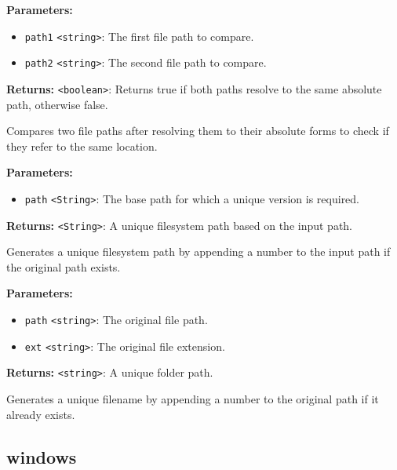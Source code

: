 \documentclass[12pt,a4paper]{article}
\begin{document}
\noindent \textbf{Parameters:}
\begin{itemize}
  \item \texttt{path1} \texttt{<string>}: The first file path to compare.
  \item \texttt{path2} \texttt{<string>}: The second file path to compare.
\end{itemize}

\noindent \textbf{Returns:} \texttt{<boolean>}: Returns true if both paths resolve to the same absolute path, otherwise false.

\noindent Compares two file paths after resolving them to their absolute forms to check if they refer to the same location.

\vspace{5mm}
\noindent {}


\noindent \textbf{Parameters:}
\begin{itemize}
  \item \texttt{path} \texttt{<String>}: The base path for which a unique version is required.
\end{itemize}

\noindent \textbf{Returns:} \texttt{<String>}: A unique filesystem path based on the input path.

\noindent Generates a unique filesystem path by appending a number to the input path if the original path exists.

\vspace{5mm}
\noindent {}


\noindent \textbf{Parameters:}
\begin{itemize}
  \item \texttt{path} \texttt{<string>}: The original file path.
  \item \texttt{ext} \texttt{<string>}: The original file extension.
\end{itemize}

\noindent \textbf{Returns:} \texttt{<string>}: A unique folder path.

\noindent Generates a unique filename by appending a number to the original path if it already exists.


\subsection{windows}
\vspace{5mm}
\noindent {}\vspace{4mm}
\end{document}
